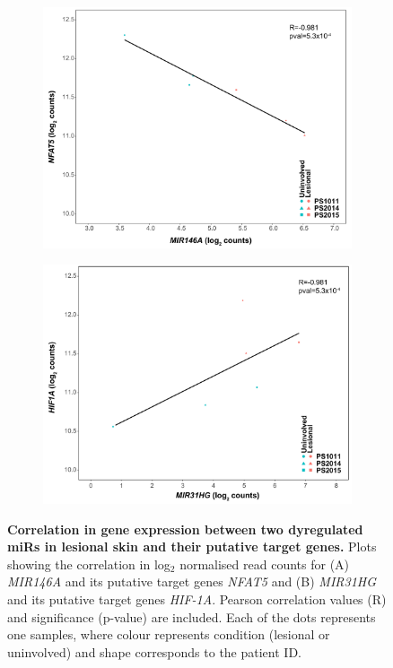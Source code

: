 \begin{figure}[htbp]
\centering
\begin{subfigure}{0.45\textwidth}
\centering
\includegraphics[width=\textwidth]{./Results2/pdfs/Skin_RNAseq_correlation_MIR146A_NFAT5_plot}
\caption{\textbf{}}
\end{subfigure}%
\begin{subfigure}{0.45 \textwidth}
\centering
\includegraphics[width=\textwidth]{./Results2/pdfs/Skin_RNAseq_correlation_MIR31HG_HIF1A_plot}
\caption{\textbf{}}
\end{subfigure}
\caption[Correlation in gene expression between two dyregulated miRs in lesional skin and their putative target genes.]{\textbf{Correlation in gene expression between two dyregulated miRs in lesional skin and their putative target genes.} Plots showing the correlation in log$_2$ normalised read counts for (A) \textit{MIR146A} and its putative target genes \textit{NFAT5} and (B) \textit{MIR31HG} and its putative target genes \textit{HIF-1A}. Pearson correlation values (R) and significance (p-value) are included. Each of the dots represents one samples, where colour represents condition (lesional or uninvolved) and shape corresponds to the patient ID.}
\label{figure:RNAseq_lesional_uninvolved_miR_correlations}
\end{figure}
